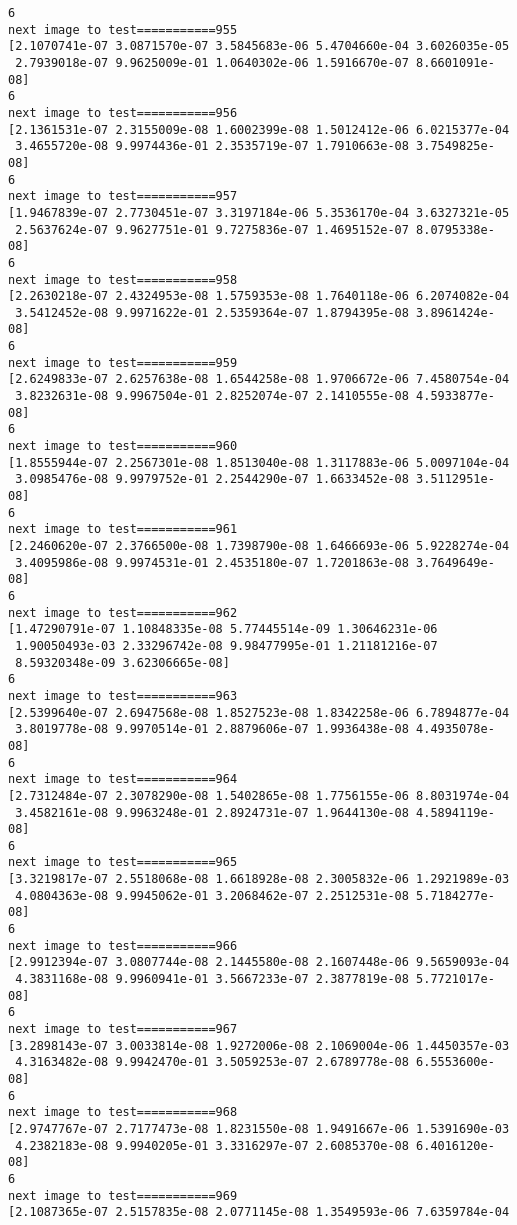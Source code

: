 \documentclass[11pt]{article}
\begin{document}
\begin{Verbatim}[commandchars=\\\{\}]
6
next image to test===========955
[2.1070741e-07 3.0871570e-07 3.5845683e-06 5.4704660e-04 3.6026035e-05
 2.7939018e-07 9.9625009e-01 1.0640302e-06 1.5916670e-07 8.6601091e-08]
6
next image to test===========956
[2.1361531e-07 2.3155009e-08 1.6002399e-08 1.5012412e-06 6.0215377e-04
 3.4655720e-08 9.9974436e-01 2.3535719e-07 1.7910663e-08 3.7549825e-08]
6
next image to test===========957
[1.9467839e-07 2.7730451e-07 3.3197184e-06 5.3536170e-04 3.6327321e-05
 2.5637624e-07 9.9627751e-01 9.7275836e-07 1.4695152e-07 8.0795338e-08]
6
next image to test===========958
[2.2630218e-07 2.4324953e-08 1.5759353e-08 1.7640118e-06 6.2074082e-04
 3.5412452e-08 9.9971622e-01 2.5359364e-07 1.8794395e-08 3.8961424e-08]
6
next image to test===========959
[2.6249833e-07 2.6257638e-08 1.6544258e-08 1.9706672e-06 7.4580754e-04
 3.8232631e-08 9.9967504e-01 2.8252074e-07 2.1410555e-08 4.5933877e-08]
6
next image to test===========960
[1.8555944e-07 2.2567301e-08 1.8513040e-08 1.3117883e-06 5.0097104e-04
 3.0985476e-08 9.9979752e-01 2.2544290e-07 1.6633452e-08 3.5112951e-08]
6
next image to test===========961
[2.2460620e-07 2.3766500e-08 1.7398790e-08 1.6466693e-06 5.9228274e-04
 3.4095986e-08 9.9974531e-01 2.4535180e-07 1.7201863e-08 3.7649649e-08]
6
next image to test===========962
[1.47290791e-07 1.10848335e-08 5.77445514e-09 1.30646231e-06
 1.90050493e-03 2.33296742e-08 9.98477995e-01 1.21181216e-07
 8.59320348e-09 3.62306665e-08]
6
next image to test===========963
[2.5399640e-07 2.6947568e-08 1.8527523e-08 1.8342258e-06 6.7894877e-04
 3.8019778e-08 9.9970514e-01 2.8879606e-07 1.9936438e-08 4.4935078e-08]
6
next image to test===========964
[2.7312484e-07 2.3078290e-08 1.5402865e-08 1.7756155e-06 8.8031974e-04
 3.4582161e-08 9.9963248e-01 2.8924731e-07 1.9644130e-08 4.5894119e-08]
6
next image to test===========965
[3.3219817e-07 2.5518068e-08 1.6618928e-08 2.3005832e-06 1.2921989e-03
 4.0804363e-08 9.9945062e-01 3.2068462e-07 2.2512531e-08 5.7184277e-08]
6
next image to test===========966
[2.9912394e-07 3.0807744e-08 2.1445580e-08 2.1607448e-06 9.5659093e-04
 4.3831168e-08 9.9960941e-01 3.5667233e-07 2.3877819e-08 5.7721017e-08]
6
next image to test===========967
[3.2898143e-07 3.0033814e-08 1.9272006e-08 2.1069004e-06 1.4450357e-03
 4.3163482e-08 9.9942470e-01 3.5059253e-07 2.6789778e-08 6.5553600e-08]
6
next image to test===========968
[2.9747767e-07 2.7177473e-08 1.8231550e-08 1.9491667e-06 1.5391690e-03
 4.2382183e-08 9.9940205e-01 3.3316297e-07 2.6085370e-08 6.4016120e-08]
6
next image to test===========969
[2.1087365e-07 2.5157835e-08 2.0771145e-08 1.3549593e-06 7.6359784e-04

\end{Verbatim}
\end{document}
